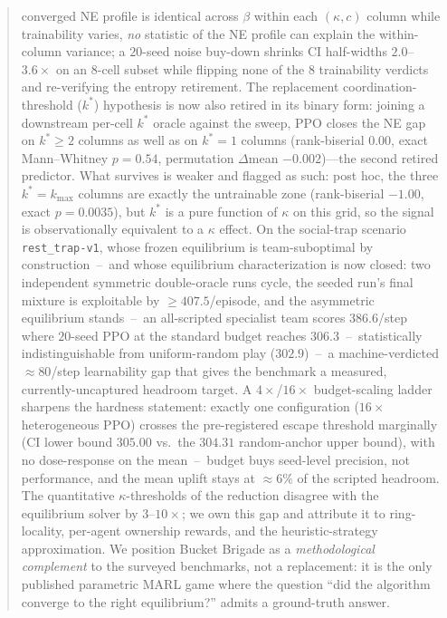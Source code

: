 \documentclass{anvil-paper}
\begin{document}
\begin{abstract}
converged NE profile is identical across $\beta$ within each
$(\kappa,c)$ column while trainability varies, \emph{no} statistic of
the NE profile can explain the within-column variance; a $20$-seed
noise buy-down shrinks CI half-widths $2.0$--$3.6{\times}$ on an
$8$-cell subset while flipping none of the $8$ trainability verdicts
and re-verifying the entropy retirement. The replacement
coordination-threshold ($k^{*}$) hypothesis is now also retired in its
binary form: joining a downstream per-cell $k^{*}$ oracle against the
sweep, PPO closes the NE gap on $k^{*}{\geq}2$ columns as well as on
$k^{*}{=}1$ columns (rank-biserial $0.00$, exact Mann--Whitney
$p{=}0.54$, permutation $\Delta$mean $-0.002$)---the second retired
predictor. What survives is weaker and flagged as such: post hoc, the
three $k^{*}{=}k_{\max}$ columns are exactly the untrainable zone
(rank-biserial $-1.00$, exact $p{=}0.0035$), but $k^{*}$ is a pure
function of $\kappa$ on this grid, so the signal is observationally
equivalent to a $\kappa$ effect. On the
social-trap scenario \texttt{rest\_trap-v1}, whose frozen equilibrium
is team-suboptimal by construction~--~and whose equilibrium
characterization is now closed: two independent symmetric double-oracle
runs cycle, the seeded run's final mixture is exploitable by
${\geq}407.5$/episode, and the asymmetric equilibrium stands~--~an
all-scripted specialist team scores $386.6$/step where $20$-seed PPO
at the standard budget reaches $306.3$~--~statistically
indistinguishable from uniform-random play
($302.9$)~--~a machine-verdicted ${\approx}80$/step learnability gap
that gives the benchmark a measured, currently-uncaptured headroom
target. A $4{\times}$/$16{\times}$ budget-scaling ladder sharpens the
hardness statement: exactly one configuration ($16{\times}$
heterogeneous PPO) crosses the pre-registered escape threshold
marginally (CI lower bound $305.00$ vs.\ the $304.31$ random-anchor
upper bound), with no dose-response on the mean~--~budget buys
seed-level precision, not performance, and the mean uplift stays at
${\approx}6\%$ of the scripted headroom. The quantitative
$\kappa$-thresholds of the reduction disagree with the equilibrium solver
by $3$--$10\times$; we own this gap and attribute it to ring-locality,
per-agent ownership rewards, and the heuristic-strategy approximation. We position Bucket Brigade as a \emph{methodological
complement} to the surveyed benchmarks, not a replacement: it is the only
published parametric MARL game where the question ``did the algorithm
converge to the right equilibrium?'' admits a ground-truth answer.
\end{abstract}
\end{document}
